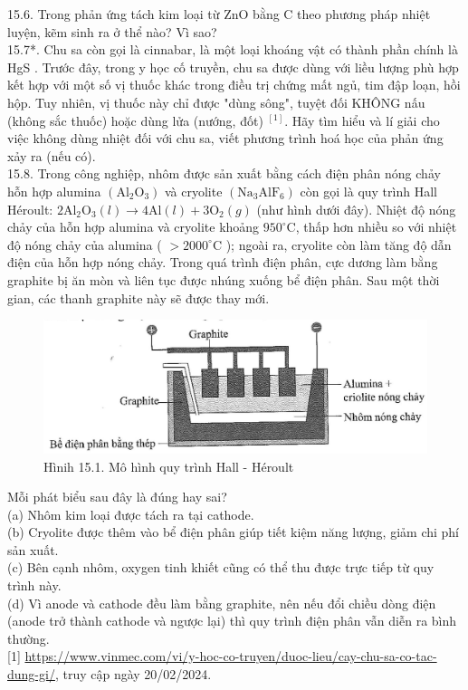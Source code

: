 \documentclass[10pt]{article}
\begin{document}
15.6. Trong phản ứng tách kim loại từ ZnO bằng C theo phương pháp nhiệt luyện, kẽm sinh ra ở thể nào? Vì sao?\\
15.7*. Chu sa còn gọi là cinnabar, là một loại khoáng vật có thành phần chính là HgS . Trước đây, trong y học cố truyền, chu sa được dùng với liều lượng phù hợp kết hợp với một số vị thuốc khác trong điều trị chứng mất ngủ, tim đập loạn, hồi hộp. Tuy nhiên, vị thuốc này chỉ được "dùng sông", tuyệt đối KHÔNG nấu (không sắc thuốc) hoặc dùng lửa (nướng, đốt) ${ }^{[1]}$. Hãy tìm hiểu và lí giải cho việc không dùng nhiệt đối với chu sa, viết phương trình hoá học của phản ứng xảy ra (nếu có).\\
15.8. Trong công nghiệp, nhôm được sản xuất bằng cách điện phân nóng chảy hỗn hợp alumina $\left(\mathrm{Al}_{2} \mathrm{O}_{3}\right)$ và cryolite $\left(\mathrm{Na}_{3} \mathrm{AlF}_{6}\right)$ còn gọi là quy trình Hall Héroult: $2 \mathrm{Al}_{2} \mathrm{O}_{3}(l) \rightarrow 4 \mathrm{Al}(l)+3 \mathrm{O}_{2}(g)$ (như hình dưới đây). Nhiệt độ nóng chảy của hỗn hợp alumina và cryolite khoảng $950^{\circ} \mathrm{C}$, thấp hơn nhiều so với nhiệt độ nóng chảy của alumina ( $>2000^{\circ} \mathrm{C}$ ); ngoài ra, cryolite còn làm tăng độ dẫn điện của hỗn hợp nóng chảy. Trong quá trình điện phân, cực dương làm bằng graphite bị ăn mòn và liên tục được nhúng xuống bể điện phân. Sau một thời gian, các thanh graphite này sẽ được thay mới.

\begin{figure}[h]
\begin{center}
  \includegraphics[width=\textwidth]{2025_10_23_80c1361fcdcd395cad8eg-48}
\captionsetup{labelformat=empty}
\caption{Hìnih 15.1. Mô hình quy trình Hall - Héroult}
\end{center}
\end{figure}

Mỗi phát biểu sau đây là đúng hay sai?\\
(a) Nhôm kim loại được tách ra tại cathode.\\
(b) Cryolite được thêm vào bể điện phân giúp tiết kiệm năng lượng, giảm chi phí sản xuất.\\
(c) Bên cạnh nhôm, oxygen tinh khiết cũng có thể thu được trực tiếp từ quy trình này.\\
(d) Vì anode và cathode đều làm bằng graphite, nên nếu đổi chiều dòng điện (anode trở thành cathode và ngược lại) thì quy trình điện phân vẫn diễn ra bình thường.\\[0pt]
[1] \href{https://www.vinmec.com/vi/y-hoc-co-truyen/duoc-lieu/cay-chu-sa-co-tac-dung-gi/}{https://www.vinmec.com/vi/y-hoc-co-truyen/duoc-lieu/cay-chu-sa-co-tac-dung-gi/}, truy cập ngày 20/02/2024.
\end{document}
